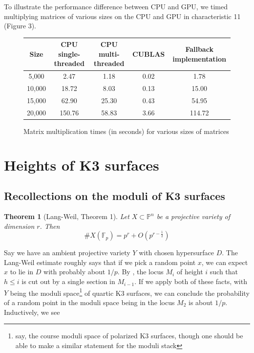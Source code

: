 \documentclass[a4paper]{article}
\newtheorem{thm}{Theorem}[section]
\theoremstyle{definition}
\theoremstyle{remark}
\newcommand{\ins}{\subset}
\begin{document}
To illustrate the performance difference between CPU and GPU, we timed
multiplying matrices of various sizes on the CPU and GPU in 
characteristic 11 (Figure 3).

\begin{figure}[h]
\begin{center}
\begin{tabular}{c c c c c}
    \toprule
    Size & CPU single-threaded & CPU multi-threaded & CUBLAS & Fallback implementation \\
    \midrule
    5,000  & 2.47   & 1.18  & 0.02 & 1.78   \\
    10,000 & 18.72  & 8.03  & 0.13 & 15.00  \\
    15,000 & 62.90  & 25.30 & 0.43 & 54.95  \\
    20,000 & 150.76 & 58.83 & 3.66 & 114.72 \\
    \bottomrule
\end{tabular}
\caption{Matrix multiplication times (in seconds) for various sizes of matrices}
\end{center}
\end{figure}


\section{Heights of K3 surfaces}
\label{sec:heights:surfaces}

\subsection{Recollections on the moduli of K3 surfaces}


\begin{thm}
    [Lang-Weil, \cite{lang-weil-1954-estimate} Theorem 1]
	Let \(X \ins \mathbb{P}^{n}\)
	be a projective variety of dimension \(r\). 
	Then 
	\[
		\#X(\mathbb{F}_{p}) = p^r + O(p^{r - \frac{1}{2}})
	\] 
\end{thm}

Say we have an ambient projective variety
\(Y\) with chosen
hypersurface \(D\).
The Lang-Weil estimate roughly
says that if we pick a random point \(x\),
we can expect \(x\) to lie in \(D\) 
with probably about \(1 / p\).
By \cite[Section~7]{artin-1974-k3-surfaces}, 
the locus \(M_{i}\) of height \(i\) such that \(h \leq i\)
is cut out by a single section in 
\(M_{i-1}\).
If we apply both of these facts,
with \(Y\) being the 
moduli space\footnote{
	say, the course moduli space of polarized K3 surfaces,
	though one should be able to make a similar statement
	for the moduli stack
} of quartic K3 surfaces,
we can conclude 
the probability of a random point 
in the moduli space being in the locus
\(M_{2}\) is about \(1 / p\). 
Inductively, we see 
\end{document}
